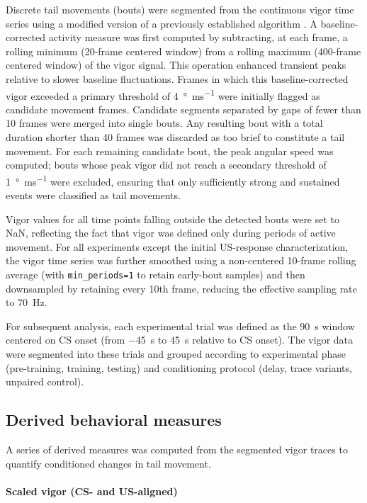 Discrete tail movements (bouts) were segmented from the continuous vigor time series using a modified version of a previously established algorithm \citep{Marques2018}. A baseline-corrected activity measure was first computed by subtracting, at each frame, a rolling minimum (20-frame centered window) from a rolling maximum (400-frame centered window) of the vigor signal. This operation enhanced transient peaks relative to slower baseline fluctuations. Frames in which this baseline-corrected vigor exceeded a primary threshold of \SI{4}{\degree\per\milli\second} were initially flagged as candidate movement frames. Candidate segments separated by gaps of fewer than 10 frames were merged into single bouts. Any resulting bout with a total duration shorter than 40 frames was discarded as too brief to constitute a tail movement. For each remaining candidate bout, the peak angular speed was computed; bouts whose peak vigor did not reach a secondary threshold of \SI{1}{\degree\per\milli\second} were excluded, ensuring that only sufficiently strong and sustained events were classified as tail movements.

Vigor values for all time points falling outside the detected bouts were set to NaN, reflecting the fact that vigor was defined only during periods of active movement. For all experiments except the initial US-response characterization, the vigor time series was further smoothed using a non-centered 10-frame rolling average (with \texttt{min\_periods=1} to retain early-bout samples) and then downsampled by retaining every 10th frame, reducing the effective sampling rate to \SI{70}{\hertz}.

For subsequent analysis, each experimental trial was defined as the \SI{90}{\second} window centered on CS onset (from \SI{-45}{\second} to \SI{+45}{\second} relative to CS onset). The vigor data were segmented into these trials and grouped according to experimental phase (pre-training, training, testing) and conditioning protocol (delay, trace variants, unpaired control).

\subsection{Derived behavioral measures}

A series of derived measures was computed from the segmented vigor traces to quantify conditioned changes in tail movement.

\paragraph{Scaled vigor (CS- and US-aligned)}

